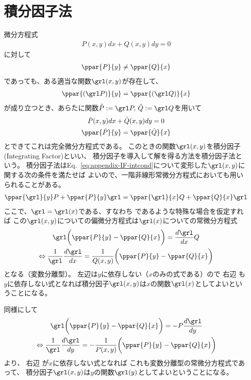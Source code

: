 \section{積分因子法}
微分方程式
\begin{gather}
  P(x,y)dx + Q(x,y)dy = 0
\end{gather}
に対して
\begin{gather}
  \ppar{P}{y} \neq \ppar{Q}{x}
\end{gather}
であっても、ある適当な関数$\grl(x,y)$が存在して、
\begin{gather}
  \ppar{(\grl P)}{y} = \ppar{(\grl Q)}{x} \label{eq:appendix-IF-intcond}
\end{gather}
が成り立つとき、あらたに関数$\hat{P}:=\grl P,\,\hat{Q}:=\grl Q$を用いて
\begin{gather}
  \hat{P}(x,y) dx + \hat{Q}(x,y) dy = 0 \\
  \ppar{\hat{P}}{y} = \ppar{\hat{Q}}{x}
\end{gather}
とできてこれは完全微分方程式である。
このときの関数$\grl(x,y)$を積分因子(Integrating Factor)といい、
積分因子を導入して解を得る方法を積分因子法という。
積分因子法はEq.~\eqref{eq:appendix-IF-intcond}について変形した$\grl(x,y)$に関する次の条件を満たせば
よいので、一階非線形常微分方程式においても用いられることがある。
\begin{gather}
  \ppar{\grl}{y}P + \ppar{P}{y}\grl = \ppar{\grl}{x}Q + \ppar{Q}{x}\grl
\end{gather}
ここで、$\grl=\grl(x)$である、すなわち
であるような特殊な場合を仮定すれば
この$\grl(x,y)$についての偏微分方程式は$\grl(x)$についての常微分方程式
\begin{gather}
  \grl\biggl(\ppar{P}{y} - \ppar{Q}{x}\biggr) = \frac{d\grl}{dx}Q \\
  \Leftrightarrow
  \frac{1}{\grl}\frac{d\grl}{dx} = \frac{1}{Q(x,y)}\biggl(\ppar{P}{y} - \ppar{Q}{x}\biggr)
\end{gather}
となる（変数分離型）。
左辺は$y$に依存しない（$x$のみの式である）ので
右辺
も$y$に依存しない式となれば積分因子$\grl(x,y)$は$x$の関数$\grl(x)$としてよいということになる。

同様にして
\begin{gather*}
  \grl\biggl(\ppar{P}{y}-\ppar{Q}{x}\biggr)=-P\frac{d\grl}{dy} \\
  \Leftrightarrow
  \frac{1}{\grl}\frac{d\grl}{dy} = -\frac{1}{P(x,y)}\biggl(\ppar{P}{y}-\ppar{Q}{x}\biggr)
\end{gather*}
より、
右辺
が$x$に依存しない式となれば
これも変数分離型の常微分方程式であって、
積分因子$\grl(x,y)$は$y$の関数$\grl(y)$としてよいということになる。

